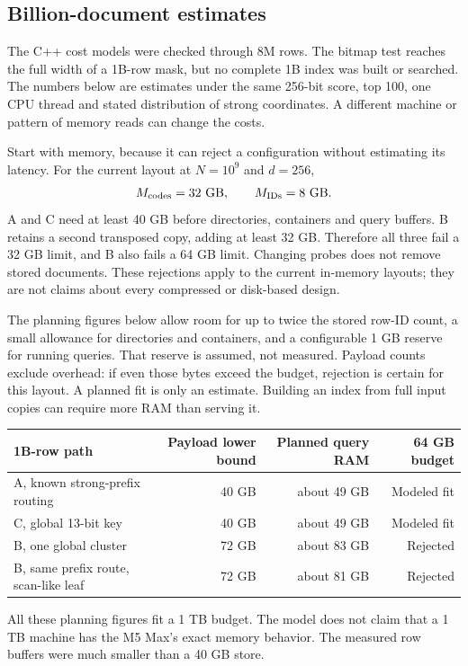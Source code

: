 \subsection{Billion-document estimates}
\label{sec:billion}
The C++ cost models were checked through 8M rows. The bitmap test reaches the full width
of a 1B-row mask, but no complete 1B index was built or searched. The numbers below are
estimates under the same 256-bit score, top 100, one CPU thread and stated distribution of
strong coordinates. A different machine or pattern of memory reads can change the costs.

Start with memory, because it can reject a configuration without estimating its latency.
For the current layout at $N=10^9$ and $d=256$,
\[
M_{\rm codes}=32\ \mathrm{GB},\qquad M_{\rm IDs}=8\ \mathrm{GB}.
\]
A and C need at least 40 GB before directories, containers and query buffers. B retains a
second transposed copy, adding at least 32 GB. Therefore all three fail a 32 GB limit, and B
also fails a 64 GB limit. Changing probes does not remove stored documents. These rejections
apply to the current in-memory layouts; they are not claims about every compressed or disk-based design.

The planning figures below allow room for up to twice the stored row-ID count, a small
allowance for directories and containers, and a configurable 1 GB reserve for running queries.
That reserve is assumed, not measured. Payload counts exclude overhead: if even those bytes
exceed the budget, rejection is certain for this layout. A planned fit is only an estimate. Building an index from full input copies can require more RAM than serving it.

\begin{center}\small
\begin{tabular}{@{}lrrr@{}}\toprule
1B-row path & Payload lower bound & Planned query RAM & 64 GB budget\\\midrule
A, known strong-prefix routing & 40 GB & about 49 GB & Modeled fit\\
C, global 13-bit key & 40 GB & about 49 GB & Modeled fit\\
B, one global cluster & 72 GB & about 83 GB & Rejected\\
B, same prefix route, scan-like leaf & 72 GB & about 81 GB & Rejected\\\bottomrule
\end{tabular}\normalsize\end{center}
All these planning figures fit a 1 TB budget. The model does not claim that a 1 TB machine has
the M5 Max's exact memory behavior. The measured row buffers were much smaller than a 40 GB store.

